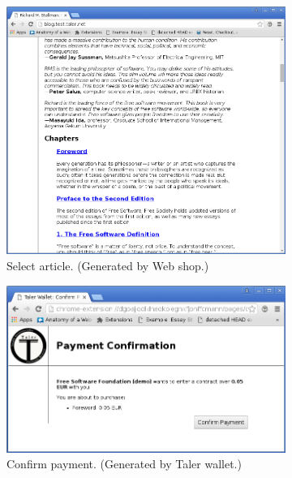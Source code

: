 \documentclass{IEEEtran}
\begin{document}
\begin{figure}[b!]
\begin{subfigure}[H]{0.5\textwidth}
\includegraphics[width=\textwidth]{figs/cart.png}
\caption{Select article. (Generated by Web shop.)}
\label{subfig:cart}
\end{subfigure}
\begin{subfigure}{0.5\textwidth}
\includegraphics[width=\textwidth]{figs/pay.png}
\caption{Confirm payment. (Generated by Taler wallet.)}
\label{subfig:payment}
\end{subfigure}
\begin{subfigure}{0.5\textwidth}

\end{subfigure}
\end{figure}
\end{document}
